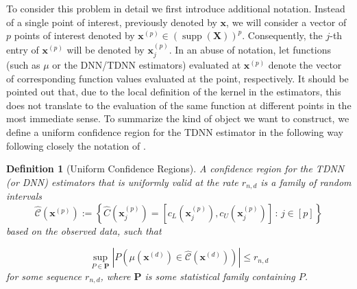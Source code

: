 \documentclass[letterpaper,10pt]{article}
\numberwithin{equation}{section}
\numberwithin{thm}{section}
\newtheorem{dfn}{Definition}
\renewcommand{\hat}{\widehat}
\newcommand{\1}{\mathbb{1}}
\begin{document}
To consider this problem in detail we first introduce additional notation.
Instead of a single point of interest, previously denoted by $\mathbf{x}$, we will consider a vector of $p$ points of interest denoted by $\mathbf{x}^{(p)} \in \left(\operatorname{supp}\left(\mathbf{X}\right)\right)^{p}$.
Consequently, the $j$-th entry of $\mathbf{x}^{(p)}$ will be denoted by $\mathbf{x}^{(p)}_{j}$.
In an abuse of notation, let functions (such as $\mu$ or the DNN/TDNN estimators) evaluated at $\mathbf{x}^{(p)}$ denote the vector of corresponding function values evaluated at the point, respectively.
It should be pointed out that, due to the local definition of the kernel in the estimators, this does not translate to the evaluation of the same function at different points in the most immediate sense.
To summarize the kind of object we want to construct, we define a uniform confidence region for the TDNN estimator in the following way following closely the notation of \citet{ritzwoller_uniform_2024}.

\vspace{0.5cm}
\begin{dfn}[Uniform Confidence Regions]
	A confidence region for the TDNN (or DNN) estimators that is uniformly valid at the rate $r_{n,d}$ is a family of random intervals
	\begin{equation}
		\hat{\mathcal{C}}\left(\mathbf{x}^{(p)}\right)
		:= \left\{\hat{C}(\mathbf{x}^{(p)}_{j})
		= \left[c_{L}(\mathbf{x}^{(p)}_{j}), c_{U}(\mathbf{x}^{(p)}_{j})\right]\, : \, j \in [p]\right\}
	\end{equation}
	based on the observed data, such that

	\begin{equation}
		\sup_{P \in \mathbf{P}} \left| P\left(\mu(\mathbf{x}^{(d)}) \in \hat{\mathcal{C}}\left(\mathbf{x}^{(d)}\right)\right) \right| \leq r_{n,d}
	\end{equation}
	for some sequence $r_{n,d}$, where $\mathbf{P}$ is some statistical family containing $P$.
\end{dfn}
\end{document}
